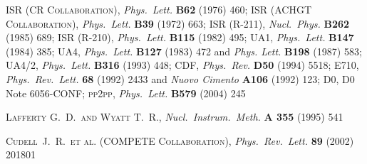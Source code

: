 \documentclass[TOTEM]{cern/cernphprep}
\def\etal{et al.}
\def\Name#1{\textsc{#1}, }
\def\REVIEW#1#2#3#4{{\it #1} {\bf #2} (#3) #4}
\begin{document}
\begin{thebibliography}{99}

	\Name{ISR (CR Collaboration)} \REVIEW{Phys.~Lett.}{B62}{1976}{460}; 
	\Name{ISR (ACHGT Collaboration)} \REVIEW{Phys.~Lett.}{B39}{1972}{663}; 
	\Name{ISR (R-211)} \REVIEW{Nucl.~Phys.}{B262}{1985}{689}; 
	\Name{ISR (R-210)} \REVIEW{Phys.~Lett.}{B115}{1982}{495}; 
	\Name{UA1} \REVIEW{Phys.~Lett.}{B147}{1984}{385}; 
	\Name{UA4} \REVIEW{Phys.~Lett.}{B127}{1983}{472} and \REVIEW{Phys. Lett.}{B198}{1987}{583}; 
	\Name{UA4/2} \REVIEW{Phys.~Lett.}{B316}{1993}{448}; 
	\Name{CDF} \REVIEW{Phys.~Rev.}{D50}{1994}{5518}; 
	\Name{E710} \REVIEW{Phys.~Rev.~Lett.}{68}{1992}{2433} and \REVIEW{Nuovo Cimento}{A106}{1992}{123}; 
	\Name{D0} D0 Note 6056-CONF; 
	\Name{pp2pp} \REVIEW{Phys.~Lett.}{B579}{2004}{245}

	\Name{Lafferty G.~D.~and Wyatt T.~R.}
	\REVIEW{Nucl.\ Instrum.\ Meth.}{A 355}{1995}{541}

	\Name{Cudell~J.~R.~\etal{} (COMPETE Collaboration)}
	\REVIEW{Phys.\ Rev.\ Lett.}{89}{2002}{201801}

\fi

\end{thebibliography}
\end{document}
